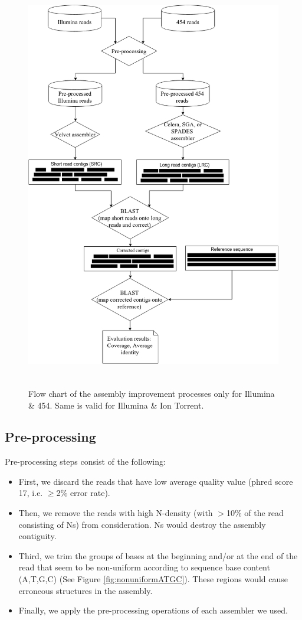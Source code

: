 \documentclass{llncs}
\begin{document}
\begin{figure}[h!tbp]
\centerline{\includegraphics[width=12cm, height=18cm]{flowChart.png}}
\caption{Flow chart of the assembly improvement processes only for Illumina \& 454. Same is valid for Illumina \& Ion Torrent.}
\label{fig:flowChart}
\end{figure}



\subsection{Pre-processing} 
\label{pre}
Pre-processing steps consist of the following: 
\begin{itemize}
\item First, we discard the reads that have low average quality value (phred score 17, i.e. $\geq$2\% error rate). 
\item Then, we remove the reads with high N-density (with $>$10\% of the read consisting of Ns) from consideration. Ns would destroy the assembly contiguity. 
\item Third, we trim the groups of bases at the beginning and/or at the end of the read that seem to be non-uniform according to sequence base content (A,T,G,C) (See Figure \ref{fig:nonuniformATGC}). These regions would cause erroneous structures in the assembly.
\item Finally, we apply the pre-processing operations of each assembler we used.
\end{itemize}
\end{document}
